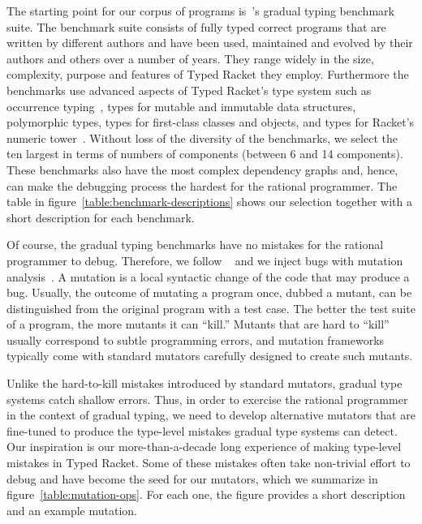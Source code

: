 The starting point for our corpus of programs
is~\citet{gtnffvf-jfp-2019}'s gradual typing benchmark suite. The
benchmark suite consists of fully typed correct programs that are written by different authors
and have been used, maintained and evolved by their authors and others over a
number of years.  They range widely in the size, complexity, purpose and
features of Typed Racket they employ.  Furthermore the benchmarks use advanced aspects
of Typed Racket's type system such as occurrence
typing~\cite{tf-icfp-2010}, types for mutable and immutable data
structures, polymorphic types, types for first-class classes and objects, and types for
Racket's numeric tower~\cite{stathff-padl-12}. Without loss of the diversity of the benchmarks,
we select the ten largest in terms of numbers of components (between 6 and 14 components).
These benchmarks also have the most complex dependency graphs and, hence,
can make the debugging process the hardest for the rational programmer.
The table in figure~\ref{table:benchmark-descriptions} shows our selection
together with a short description for each benchmark.



Of course, the gradual typing benchmarks have no mistakes for the rational
programmer to debug. Therefore, we follow ~\citet{lksfd-popl-2020} and we
inject bugs with mutation
analysis~\cite{jia2011analysis,demillo1978hints,lipton1971fault}.  A
mutation is a local syntactic change of the code that may
produce a bug. Usually, the outcome of mutating a program once, dubbed a
mutant, can be distinguished from the original program with a test case.
The better the test suite of a program, the more mutants it can ``kill.''
Mutants that are hard to ``kill'' usually correspond to subtle programming
errors, and mutation frameworks typically come with standard mutators
carefully designed to create such mutants.

Unlike the hard-to-kill mistakes introduced by standard mutators, 
gradual type systems catch shallow errors.  Thus, in order to
exercise the rational programmer in the context of gradual typing, 
we need to develop alternative mutators
that are fine-tuned to produce the type-level mistakes gradual type systems 
can detect. Our inspiration is our
more-than-a-decade long experience of making type-level mistakes in Typed
Racket. Some of these mistakes often take non-trivial effort to debug and
have become the seed for our mutators, which we summarize in
figure~\ref{table:mutation-ops}.  For each one, the figure provides a
short description and an example mutation.


